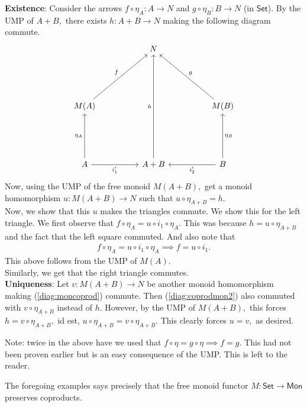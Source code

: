 \documentclass[11pt,leqno,landscape,semhelv]{seminar}
\theoremstyle{definition}
\numberwithin{joke}{section}
\numberwithin{thm}{section}
\numberwithin{equation}{section}
\begin{document}
\textbf{Existence}: Consider the arrows $f\circ\eta_A:A\to N$ and $g\circ\eta_B:B\to N$ (in $\mathsf{Set}$). By the UMP of $A + B,$ there exists $h:A+B \to N$ making the following diagram commute.
\begin{equation} \label{diag:coprodmon2}
  \begin{tikzcd}
  && N &&\\&&&&\\&&&&\\
  M(A) \arrow[rruuu, "f"]            &  &                         &  & M(B) \arrow[lluuu, "g"']\\&&&&\\&&&&\\
  A \arrow[uuu, "\eta_A"] \arrow[rr, "i_1'"'] &  & A+B \arrow[uuuuuu, "h"] &  & B \arrow[ll, "i_2'"] \arrow[uuu, "\eta_B"']
  \end{tikzcd}
\end{equation}
Now, using the UMP of the free monoid $M(A + B),$ get a monoid homomorphism $u:M(A + B) \to N$ such that $u\circ\eta_{A+B} = h.$\\
Now, we show that this $u$ makes the triangles commute. We show this for the left triangle. We first observe that $f\circ \eta_A = u \circ i_1 \circ \eta_A.$ This was because $h = u \circ \eta_{A+B}$ and the fact that the left square commuted. And also note that
\begin{align*} 
  f\circ \eta_A = u \circ i_1 \circ \eta_A \implies f = u \circ i_1.
\end{align*}
This above follows from the UMP of $M(A).$\\
Similarly, we get that the right triangle commutes.\\
\textbf{Uniqueness}: Let $v:M(A+B) \to N$ be another monoid homomorphism making (\ref{diag:moncoprod}) commute. Then (\ref{diag:coprodmon2}) also commuted with $v\circ \eta_{A+B}$ instead of $h.$ However, by the UMP of $M(A+B),$ this forces $h = v\circ \eta_{A+B},$ id est, $u \circ \eta_{A+B} = v \circ \eta_{A+B}.$ This clearly forces $u = v,$ as desired.
  
Note: twice in the above have we used that $f\circ \eta = g\circ\eta \implies f = g.$ This had not been proven earlier but is an easy consequence of the UMP. This is left to the reader.

The foregoing examples says precisely that the free monoid functor $M:\mathsf{Set} \to \mathsf{Mon}$ preserves coproducts.
\end{document}
